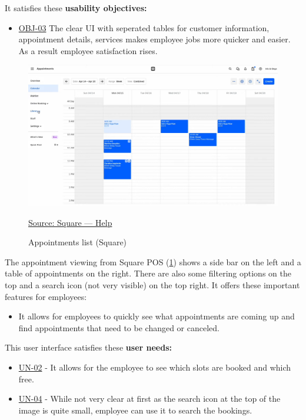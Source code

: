 \documentclass[]{VUMIFTemplateClass}
\begin{document}
It satisfies these \textbf{usability objectives:}
\begin{itemize}
    \item \hyperref[OBJ-03]{OBJ-03} The clear UI with seperated tables for customer information, appointment details, services makes employee jobs more quicker and easier. As a result employee satisfaction rises.
\end{itemize}



\begin{figure}[H]
    \centering
    \includegraphics[width=\textwidth]{images/examples/appointments_square.png}
    \caption{Appointments list (Square)}
    \href{https://squareup.com/help/us/en}{Source: Square — Help}
    \label{fig:appointment-list}
\end{figure}

The appointment viewing from Square POS (\ref{fig:appointment-list}) shows a
side bar on the left and a table of appointments on the right. There are also
some filtering options on the top and a search icon (not very visible) on the
top right. It offers these important features for employees:

\begin{itemize}
    \item It allows for employees to quickly see what appointments are coming up and find appointments that need to be changed or canceled.
\end{itemize}

This user interface satisfies these \textbf{user needs:}

\begin{itemize}
    \item \hyperref[UN-02]{UN-02} - It allows for the employee to see which slots are booked and which free.
    \item \hyperref[UN-04]{UN-04} - While not very clear at first as the search icon at the top of the image is quite small, employee can use it to search the bookings.
\end{itemize}
\end{document}

